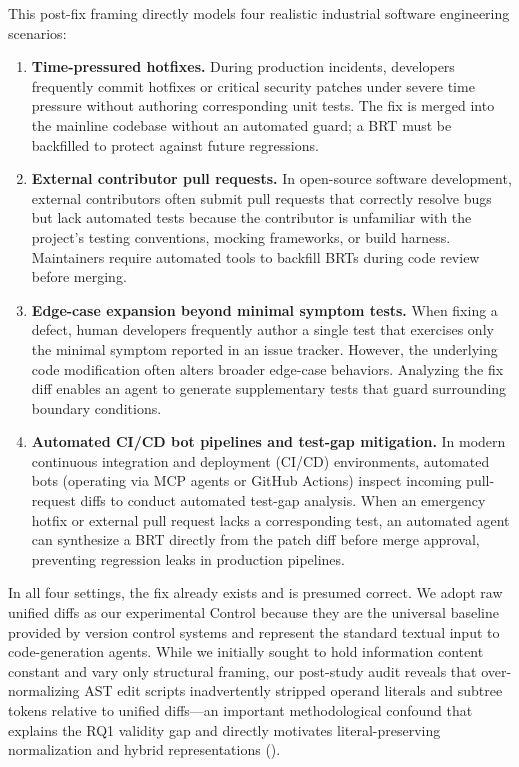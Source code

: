 \documentclass[12pt, a4paper]{article}
\begin{document}
This post-fix framing directly models four realistic industrial software engineering scenarios:
\begin{enumerate}[leftmargin=*]
  \item \textbf{Time-pressured hotfixes.}
    During production incidents, developers frequently commit hotfixes or critical security patches under severe time pressure without authoring corresponding unit tests.
    The fix is merged into the mainline codebase without an automated guard; a BRT must be backfilled to protect against future regressions.

  \item \textbf{External contributor pull requests.}
    In open-source software development, external contributors often submit pull requests that correctly resolve bugs but lack automated tests because the contributor is unfamiliar with the project's testing conventions, mocking frameworks, or build harness.
    Maintainers require automated tools to backfill BRTs during code review before merging.

  \item \textbf{Edge-case expansion beyond minimal symptom tests.}
    When fixing a defect, human developers frequently author a single test that exercises only the minimal symptom reported in an issue tracker.
    However, the underlying code modification often alters broader edge-case behaviors.
    Analyzing the fix diff enables an agent to generate supplementary tests that guard surrounding boundary conditions.

  \item \textbf{Automated CI/CD bot pipelines and test-gap mitigation.}
    In modern continuous integration and deployment (CI/CD) environments, automated bots (operating via MCP agents or GitHub Actions) inspect incoming pull-request diffs to conduct automated test-gap analysis.
    When an emergency hotfix or external pull request lacks a corresponding test, an automated agent can synthesize a BRT directly from the patch diff before merge approval, preventing regression leaks in production pipelines.
\end{enumerate}

In all four settings, the fix already exists and is presumed correct.
We adopt raw unified diffs as our experimental Control because they are the universal baseline provided by version control systems and represent the standard textual input to code-generation agents.
While we initially sought to hold information content constant and vary only structural framing, our post-study audit reveals that over-normalizing AST edit scripts inadvertently stripped operand literals and subtree tokens relative to unified diffs---an important methodological confound that explains the RQ1 validity gap and directly motivates literal-preserving normalization and hybrid representations ().
\end{document}
